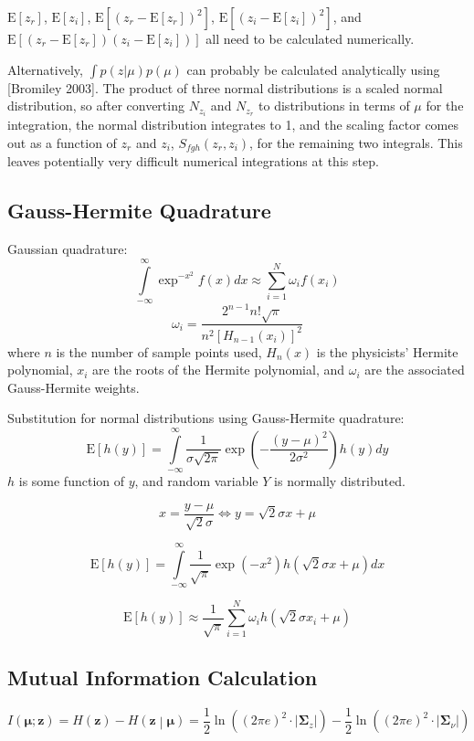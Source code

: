 \documentclass{article}         %
\theoremstyle{definition}
\theoremstyle{remark}
\newcommand{\eq}[1]{\begin{equation} #1 \end{equation}}
\newcommand{\zbf}{\mathbf{z}}
\newcommand{\mubf}{\boldsymbol{\mu}}
\newcommand{\paren}[1]{\left(#1\right)}
\newcommand{\bracket}[1]{\left[#1\right]}
\newcommand{\expect}[1]{\mathrm{E}\left[#1\right]}
\newcommand{\intinfty}{\int\limits_{-\infty}^\infty}
\newcommand{\sumin}{\sum\limits_{i=1}^N}
\begin{document}
$\expect{z_r}$, $\expect{z_i}$, $\expect{\left(z_r - \expect{z_r}\right)^2}$, $\expect{\left(z_i - \expect{z_i}\right)^2}$, and $\expect{\left(z_r - \expect{z_r}\right)\left(z_i - \expect{z_i}\right)}$ all need to be calculated numerically.
 
Alternatively, $\int p(z|\mu)p(\mu)$ can probably be calculated analytically using [Bromiley 2003]. The product of three normal distributions is a scaled normal distribution, so after converting $N_{z_i}$ and $N_{z_r}$ to distributions in terms of $\mu$ for the integration, the normal distribution integrates to 1, and the scaling factor comes out as a function of $z_r$ and $z_i$, $S_{fgh}\paren{z_r,z_i}$, for the remaining two integrals. This leaves potentially very difficult numerical integrations at this step.

\subsection{Gauss-Hermite Quadrature}

Gaussian quadrature:
\eq{\intinfty\exp^{-x^2}f\paren{x}dx \approx \sumin\omega_if\paren{x_i}}
\eq{\omega_i = \frac{2^{n-1}n!\sqrt{\pi}}{n^2\bracket{H_{n-1}\paren{x_i}}^2}}
where $n$ is the number of sample points used, $H_n\paren{x}$ is the physicists' Hermite polynomial, $x_i$ are the roots of the Hermite polynomial, and $\omega_i$ are the associated Gauss-Hermite weights.

Substitution for normal distributions using Gauss-Hermite quadrature:
\eq{\expect{h\paren{y}} = \intinfty\frac{1}{\sigma\sqrt{2\pi}}\exp\paren{-\frac{\paren{y-\mu}^2}{2\sigma^2}}h\paren{y}dy}
$h$ is some function of $y$, and random variable $Y$ is normally distributed.

\eq{x = \frac{y-\mu}{\sqrt{2}\sigma} \Leftrightarrow y = \sqrt{2}\sigma x+\mu}

\eq{\expect{h\paren{y}} = \intinfty\frac{1}{\sqrt{\pi}}\exp\paren{-x^2}h\paren{\sqrt{2}\sigma x+\mu}dx}

\eq{\expect{h\paren{y}} \approx \frac{1}{\sqrt{\pi}}\sumin\omega_i h\paren{\sqrt{2}\sigma x_i+\mu}}

\subsection{Mutual Information Calculation}

\begin{equation}
	I\left(\mubf;\zbf\right) = H\left(\zbf\right) - H\left(\zbf\middle|\mubf\right) 
	= \frac{1}{2}\ln\left(\left(2\pi e\right)^2\cdot\lvert\mathbf{\Sigma}_z\rvert\right) - \frac{1}{2}\ln\left(\left(2\pi e\right)^2\cdot\lvert\mathbf{\Sigma}_\nu\rvert\right)
\end{equation}
\end{document}
